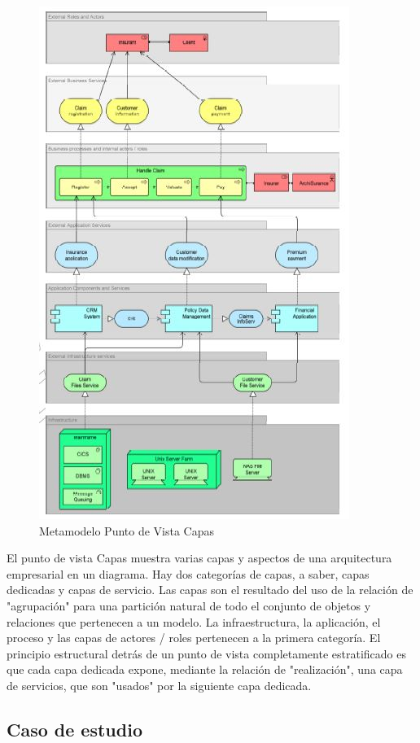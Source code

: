 \begin{figure}[th!]
	\centering
	\includegraphics[width=0.6\linewidth]{arquitectura/imagenes/modeloCapas}
	\caption{Metamodelo Punto de Vista Capas}
	\label{metamodeloCapas}
\end{figure}
El punto de vista Capas muestra varias capas y aspectos de una arquitectura empresarial en un diagrama. Hay dos categorías de capas, a saber, capas dedicadas y capas de servicio. Las capas son el resultado del uso de la relación de "agrupación" para una partición natural de todo el conjunto de objetos y relaciones que pertenecen a un modelo. La infraestructura, la aplicación, el proceso y las capas de actores / roles pertenecen a la primera categoría. El principio estructural detrás de un punto de vista completamente estratificado es que cada capa dedicada expone, mediante la relación de "realización", una capa de servicios, que son "usados" por la siguiente capa dedicada.

\newpage

\subsection{Caso de estudio}

\newpage

